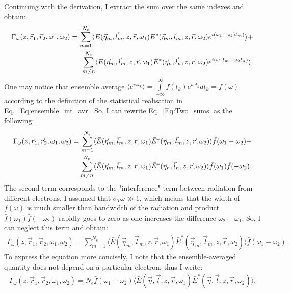     Continuing with the derivation, I extract the sum over the same indexes and obtain:
    \begin{align}
        \Gamma_\omega (z, \vec{r}_1, \vec{r}_2, \omega_1, \omega_2) =  
        \sum_{m = 1}^{N_e} \langle\bar{E}(\vec{\eta}_m, \vec{l}_m, z, \vec{r}, \omega_1)\bar{E}^*(\vec{\eta}_m, \vec{l}_m, z, \vec{r}, \omega_2)e^{i (\omega_1 -\omega_2) t_m)}\rangle + \cr
        \sum_{m \neq n}^{N_e} \langle\bar{E}(\vec{\eta}_m, \vec{l}_m, z, \vec{r}, \omega_1)\bar{E}^*(\vec{\eta}_n, \vec{l}_n, z, \vec{r}, \omega_2)e^{i (\omega_1 t_m - \omega_2 t_n)}\rangle.
        \label{Eq:Two_sums}
    \end{align}
    One may notice that ensemble average $\langle e^{i \omega t_k}\rangle = \int\limits_{-\infty}^{\infty} f(t_k) e^{i \omega t_k} dt_k = \bar{f} (\omega)$ according to the definition of the statistical realisation in Eq.~\ref{Eq:ensemble_int_avr}. So, I can rewrite Eq.~\ref{Eq:Two_sums} as the following:
    \begin{align}
        \Gamma_\omega (z, \vec{r}_1, \vec{r}_2, \omega_1, \omega_2) =  
        \sum_{m = 1}^{N_e} \langle\bar{E}(\vec{\eta}_m, \vec{l}_m, z, \vec{r}, \omega_1)\bar{E}^*(\vec{\eta}_m, \vec{l}_m, z, \vec{r}, \omega_2) \rangle\bar{f}(\omega_1 - \omega_2) + \cr
        \sum_{m \neq n}^{N_e} \langle\bar{E}(\vec{\eta}_m, \vec{l}_m, z, \vec{r}, \omega_1)\bar{E}^*(\vec{\eta}_n, \vec{l}_n, z, \vec{r}, \omega_2)\rangle\bar{f}(\omega_1)\bar{f}(-\omega_2).
        \label{Eq:Two_sums}
    \end{align}
    The second term corresponds to the "interference" term between radiation from different electrons. I assumed that $\sigma_T \omega \gg 1$, which means that the width of $\bar{f}(\omega)$ is much smaller than bandwidth of the radiation and product $\bar{f}(\omega_1)\bar{f}(-\omega_2)$ rapidly goes to zero as one increases the difference $\omega_2 - \omega_1$. So, I can neglect this term and obtain: 
    \begin{align}
        \Gamma_\omega (z, \vec{r}_1, \vec{r}_2, \omega_1, \omega_2) =  
        \sum_{m = 1}^{N_e} \langle\bar{E}(\vec{\eta}_m, \vec{l}_m, z, \vec{r}, \omega_1)\bar{E}^*(\vec{\eta}_m, \vec{l}_m, z, \vec{r}, \omega_2) \rangle\bar{f}(\omega_1 - \omega_2).
        \label{Eq:}
    \end{align}
    To express the equation more concisely, I note that the ensemble-averaged quantity does not depend on a particular electron, thus I write:
    \begin{align}
        \Gamma_\omega (z, \vec{r}_1, \vec{r}_2, \omega_1, \omega_2) =
        N_e \bar{f}(\omega_1 - \omega_2) \langle\bar{E}(\vec{\eta}, \vec{l}, z, \vec{r}, \omega_1)\bar{E}^*(\vec{\eta}, \vec{l}, z, \vec{r}, \omega_2) \rangle.
        \label{Eq:}
    \end{align} 
